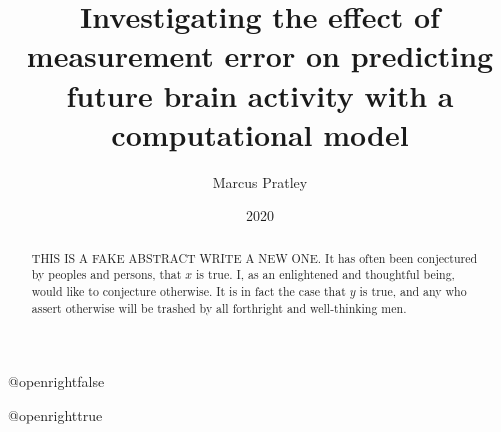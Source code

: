 \documentclass[10.5pt,twoside,openright]{report}
\title{Investigating the effect of measurement error on predicting future brain
activity with a computational model}
\author{Marcus Pratley}
\date{2020}
\begin{document}
\csname @openrightfalse\endcsname

\maketitle

\declaration

\dedication{With thanks to Frances Hutchins and Prof. Marcus Kaiser, who have both been a great help throughout the somewhat fraught process of creating this dissertation. \\ \vspace{1ex} Extra thanks also to my family, and parents in particular, for all their love and support over the course of my degree. }

\begin{abstract}
  THIS IS A FAKE ABSTRACT WRITE A NEW ONE. It has often been conjectured by
  peoples and persons, that $x$ is true. I, as an enlightened and thoughtful
  being, would like to conjecture otherwise. It is in fact the case that $y$ is
  true, and any who assert otherwise will be trashed by all forthright and
  well-thinking men.
\end{abstract}

\def\table{\def\figurename{Table}\figure}
\let\endtable\endfigure
\renewcommand\listfigurename{List of Figures and Tables}

\tableofcontents
\listoffigures
\csname @openrighttrue\endcsname




% 



\printbibliography[heading=bibintoc]
\end{document}
